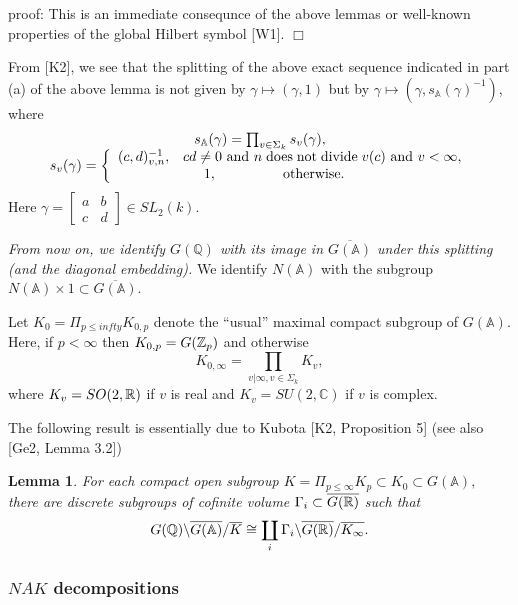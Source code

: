 \documentclass[amsfonts,12pt]{article}
\newtheorem{lemma}[theorem]{Lemma}
\def\aaa{\mathbb{A}}
\def\qqq{\mathbb{Q}}
\def\ccc{\mathbb{C}}
\begin{document}
proof: This is an immediate consequnce of the above lemmas or well-known
properties of the global Hilbert symbol [W1]. $\Box $

From [K2], we see that
the splitting of the above exact sequence indicated in part (a) of the above
lemma is not given by $\gamma \longmapsto (\gamma ,1)$ but by $\gamma
\longmapsto (\gamma ,s_{\aaa }(\gamma )^{-1})$, where 
\begin{equation}
\begin{array}{c}
s_{\aaa }(\gamma )=
\prod_{v\in \Sigma _k}
s_v(\gamma),\\
s_v(\gamma)=\left\{ 
\begin{array}{c}
(c,d)_{v,n}^{-1},
\;\;\;cd\neq 0{\rm \ and\ }
n\;\mathrm{does\;not\;divide}\;v(c)
{\rm \ and\ }v<\infty, \\ 
1,\;\;\;\;\;\;\;\;\;\;\;\;\;\;\;\;
\mathrm{\;otherwise}.\;\;\;\;\;\;\;\;
\end{array}
\right.
\end{array}
\end{equation}
Here $\gamma =\left[ 
\begin{array}{cc}
a & b \\ 
c & d
\end{array}
\right] \in SL_2(k)$.

{\em From now on, we identify $G(\qqq)$ with its image
in $\overline{G(\aaa )}$ under this splitting (and the diagonal
embedding).} We identify $N(\aaa )$ with the
subgroup
$N(\aaa )\times 1\subset \overline{G(\aaa )}$.

Let $K_0=\Pi_{p\leq infty}K_{0,p}$
denote the ``usual'' maximal compact subgroup of $G(\aaa )$.
Here, if $p<\infty $ then $K_{0,p}=G({\Bbb Z}_p)$ and
otherwise
\[
K_{0,\infty}=\prod_{ v|\infty, v\in\Sigma_k}K_v, 
\]
where $K_v=SO(2,{\Bbb{R}})$ if $v$ is real and
$K_v=SU(2,\ccc )$ if $v$ is complex.

The following result is essentially due to Kubota [K2,
Proposition 5] (see also [Ge2, Lemma 3.2])

\begin{lemma}
For each compact open subgroup $K=\Pi _{p\leq \infty }K_p\subset K_0\subset
G(\aaa ),$ there are discrete subgroups of cofinite volume $\Gamma
_i\subset \overline{G({\Bbb{R}})}$ such that 
\[
G({\Bbb Q})\backslash \overline{G(\aaa )}/\overline{K}
\cong \coprod_i
\Gamma _i\backslash \overline{G({\Bbb{R}})}/\overline{K_\infty }.
\]
\end{lemma}

\subsubsection{$NAK$ decompositions}
\end{document}

